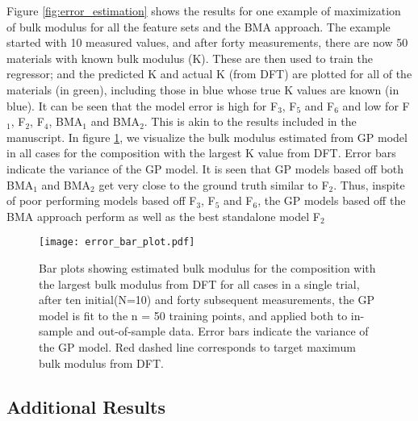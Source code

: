 \documentclass[preprint,amsmath,amssymb,aps, prb,showkeys]{revtex4-1}
\begin{document}
Figure \ref{fig:error_estimation} shows the results for one example of maximization of bulk modulus for all the feature sets and the BMA approach. The example started with 10 measured values, and after forty measurements, there are now 50 materials with known bulk modulus (K). These are then used to train the regressor;  and the predicted K and actual K (from DFT) are plotted for all of the materials (in green), including those in blue whose true K values are known (in blue). It can be seen that the model error is high for F$_3$, F$_5$ and F$_6$ and low for F$_1$, F$_2$, F$_4$, BMA$_1$ and BMA$_2$. This is akin to the results included in the manuscript. In figure \ref{fig:error_bar}, we visualize the bulk modulus estimated from GP model in all cases for the composition with the largest K value from DFT. Error bars indicate the variance of the GP model. It is seen that GP models based off both BMA$_1$ and BMA$_2$ get very close to the ground truth similar to F$_2$. Thus, inspite of poor performing models based off F$_3$, F$_5$ and F$_6$, the GP models based off the BMA approach perform as well as the best standalone model F$_2$

\begin{figure}[h!]
    \centering
    \texttt{[image: error\_bar\_plot.pdf]}
    \caption{Bar plots showing  estimated bulk modulus for the composition with the largest bulk modulus from DFT for all cases in a single trial, after ten initial(N=10) and forty subsequent measurements, the GP model is fit to the n = 50  training points, and applied both to in-sample and out-of-sample data. Error bars indicate the variance of the GP model. Red dashed line corresponds to target maximum bulk modulus from DFT. }
    \label{fig:error_bar}
\end{figure}

\newpage

\subsection{Additional Results}
\end{document}
